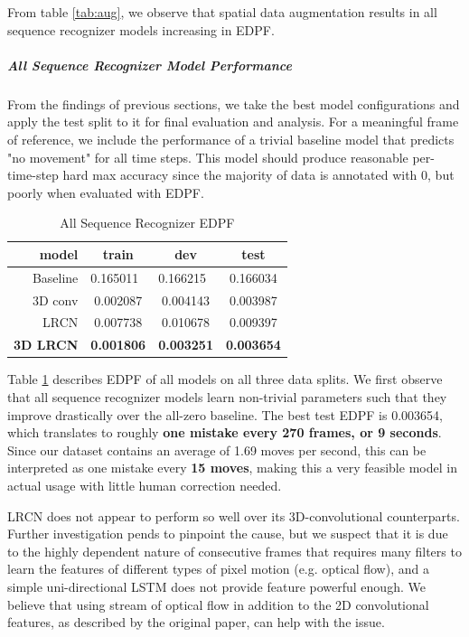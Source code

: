 \documentclass[10pt,twocolumn,letterpaper]{article}
\begin{document}
From table \ref{tab:aug}, we observe that spatial data augmentation results in all sequence recognizer models increasing in EDPF.

\vspace{-3mm}
\subparagraph{All Sequence Recognizer Model Performance}

From the findings of previous sections, we take the best model configurations and apply the test split to it for final evaluation and analysis. For a meaningful frame of reference, we include the performance of a trivial baseline model that predicts "no movement" for all time steps. This model should produce reasonable per-time-step hard max accuracy since the majority of data is annotated with 0, but poorly when evaluated with EDPF. 

\begin{table}[]
\centering
\caption{All Sequence Recognizer EDPF}
\label{tab:all-seq-recog}
\begin{tabular}{@{}rccc@{}}
\toprule
model            & train                        & dev                          & test              \\ \midrule
Baseline         & \multicolumn{1}{l}{0.165011} & \multicolumn{1}{l}{0.166215} & 0.166034          \\
3D conv          & 0.002087                     & 0.004143                     & 0.003987          \\
LRCN             & 0.007738                     & 0.010678                     & 0.009397          \\
\textbf{3D LRCN} & \textbf{0.001806}            & \textbf{0.003251}            & \textbf{0.003654} \\ \bottomrule
\end{tabular}
\end{table}

Table \ref{tab:all-seq-recog} describes EDPF of all models on all three data splits. We first observe that all sequence recognizer models learn non-trivial parameters such that they improve drastically over the all-zero baseline. The best test EDPF is 0.003654, which translates to roughly \textbf{one mistake every 270 frames, or 9 seconds}. Since our dataset contains an average of 1.69 moves per second, this can be interpreted as one mistake every \textbf{15 moves}, making this a very feasible model in actual usage with little human correction needed.

LRCN does not appear to perform so well over its 3D-convolutional counterparts. Further investigation pends to pinpoint the cause, but we suspect that it is due to the highly dependent nature of consecutive frames that requires many filters to learn the features of different types of pixel motion (e.g. optical flow), and a simple uni-directional LSTM does not provide feature powerful enough. We believe that using stream of optical flow in addition to the 2D convolutional features, as described by the original paper, can help with the issue. 
\end{document}
